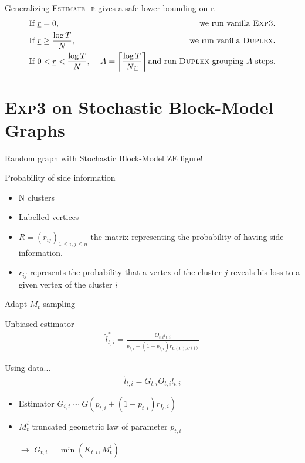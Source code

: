 \documentclass[11pt)]{beamer}
\begin{document}
\begin{frame}{Generalizing}
\textsc{Estimate\_r} gives a safe lower bounding on r.
\begin{align*}
&\text{If }\underline{r}=0,\ & \text{ we run vanilla } \textsc{Exp3}.\\
&\text{If } \underline{r} \geq \frac{\log T}{N},\  & \text{ we run vanilla }\textsc{Duplex}.\\
&\text{If } 0 < \underline{r} < \frac{\log T}{N},\ & A =\left\lceil \frac{\log T}{N \underline{r}} \right\rceil \text{and run } \textsc{Duplex} \text{ grouping } A \text{ steps}.  
\end{align*}
\end{frame}

\section{\textsc{Exp3} on Stochastic Block-Model Graphs}
\begin{frame}{Random graph with Stochastic Block-Model}
ZE figure!
\end{frame}

\begin{frame}{Probability of side information}
\begin{itemize}
\item N clusters
\item Labelled vertices
\item $R=(r_{ij})_{1 \leq i,j \leq n} $ the matrix representing the probability of having side information.
\item $r_{ij}$ represents the probability that a vertex of the cluster $j$ reveals his loss to a given vertex of the cluster $i$
\end{itemize}

\end{frame}

\begin{frame}{Adapt $M_t$ sampling}
\begin{block}{Unbiased estimator}
\begin{align*}
\hat{l}_{t,i}^{*} = \frac{O_{t,i}l_{t,i}}{p_{t,i}+(1-p_{t,i})r_{C(I_t),C(i)}}
\end{align*}
\end{block}
\begin{block}{Using data...}
\begin{align}
\hat{l}_{t,i}=G_{t,i}O_{t,i}l_{t,i}
\end{align}
\begin{itemize}
\item Estimator $G_{i,t} \sim G(p_{t,i}+(1-p_{t,i})r_{I_t,i})$
\item $M_t^i$ truncated geometric law of parameter $p_{t,i}$
\item[$\rightarrow$] $G_{t,i}=\min\left(K_{t,i},M_t^i\right)$
\end{itemize}
\end{block}
\end{frame}
\end{document}
